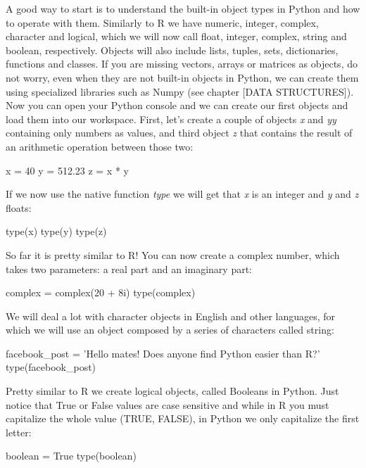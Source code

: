A good way to start is to understand the built-in object types in Python and how to operate with them. Similarly to R we have numeric, integer, complex, character and logical, which we will now call float, integer, complex, string and boolean, respectively. Objects will also include lists, tuples, sets, dictionaries, functions and classes. If you are missing vectors, arrays or matrices as objects, do not worry, even when they are not built-in objects in Python, we can create them using specialized libraries such as Numpy (see chapter [DATA STRUCTURES]). Now you can open your Python console and we can create our first objects and load them into our workspace. First, let’s create a couple of objects \emph{x} and \emph{yy} containing only numbers as values, and third object \emph{z} that contains the result of an arithmetic operation between those two:

\begin{examplepy}
x = 40
y = 512.23
z = x * y
\end{examplepy}

If we now use the native function \emph{type} we will get that \emph{x} is an integer and \emph{y} and \emph{z} floats:

\begin{examplepy}
type(x)
type(y)
type(z)
\end{examplepy}

So far it is pretty similar to R! You can now create a complex number, which takes two parameters: a real part and an imaginary part:

\begin{examplepy}
complex = complex(20 + 8i)
type(complex)
\end{examplepy}

We will deal a lot with character objects in English and other languages, for which we will use an object composed by a series of characters called string:

\begin{examplepy}
facebook_post = 'Hello mates! Does anyone find Python easier than R?'
type(facebook_post)
\end{examplepy}

Pretty similar to R we create logical objects, called Booleans in Python. Just notice that True or False values are case sensitive and while in R you must capitalize the whole value (TRUE, FALSE), in Python we only capitalize the first letter:

\begin{examplepy}
boolean = True
type(boolean)
\end{examplepy}

